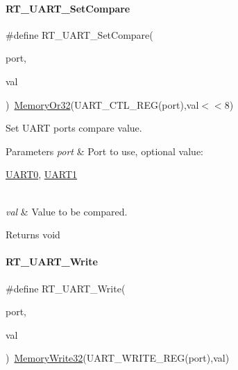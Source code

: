 \paragraph{\texorpdfstring{R\+T\+\_\+\+U\+A\+R\+T\+\_\+\+Set\+Compare}{RT\_UART\_SetCompare}}
{\footnotesize\ttfamily \#define R\+T\+\_\+\+U\+A\+R\+T\+\_\+\+Set\+Compare(\begin{DoxyParamCaption}\item[{}]{port,  }\item[{}]{val }\end{DoxyParamCaption})~\mbox{\hyperlink{a00068_a27874a97deab7cecdde5ddecf466e31e}{Memory\+Or32}}(U\+A\+R\+T\+\_\+\+C\+T\+L\+\_\+\+R\+EG(port),val$<$$<$8)}



Set U\+A\+RT port\textquotesingle{}s compare value. 


\begin{DoxyParams}{Parameters}
{\em port} & Port to use, optional value\+:
\begin{DoxyCode}
\mbox{\hyperlink{a00173_a0508661f121639ffdee7de2353a0def2}{UART0}}, \mbox{\hyperlink{a00173_a8d69bf04d07af4fbbab5a8bd291f65ff}{UART1}}
\end{DoxyCode}
 \\
\hline
{\em val} & Value to be compared. \\
\hline
\end{DoxyParams}
\begin{DoxyReturn}{Returns}
void 
\end{DoxyReturn}
\mbox{\label{a00173_a3c30d4d2e260d1c2f96747e9d7bdaf0d}} 
\paragraph{\texorpdfstring{R\+T\+\_\+\+U\+A\+R\+T\+\_\+\+Write}{RT\_UART\_Write}}
{\footnotesize\ttfamily \#define R\+T\+\_\+\+U\+A\+R\+T\+\_\+\+Write(\begin{DoxyParamCaption}\item[{}]{port,  }\item[{}]{val }\end{DoxyParamCaption})~\mbox{\hyperlink{a00068_a6b9732365b12e48ddb89fe1028b975b0}{Memory\+Write32}}(U\+A\+R\+T\+\_\+\+W\+R\+I\+T\+E\+\_\+\+R\+EG(port),val)}



